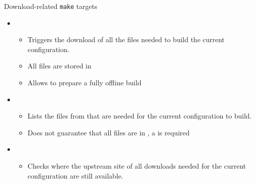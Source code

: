 \begin{frame}{Download-related {\tt make} targets}
  \begin{itemize}
  \item {}
    \begin{itemize}
    \item Triggers the download of all the files needed to build the
      current configuration.
    \item All files are stored in 
    \item Allows to prepare a fully offline build
    \end{itemize}
  \item {}
    \begin{itemize}
    \item Lists the files from  that are needed for
      the current configuration to build.
    \item Does not guarantee that all files are in , a
       is required
    \end{itemize}
  \item {}
    \begin{itemize}
    \item Checks where the upstream site of all downloads needed for
      the current configuration are still available.
    \end{itemize}
  \end{itemize}
\end{frame}
